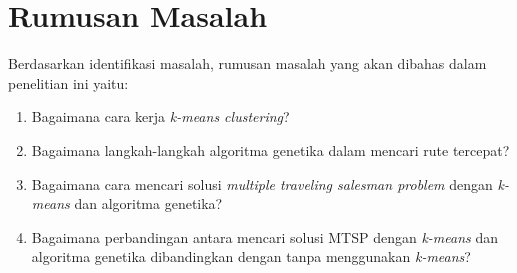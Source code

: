 \section{Rumusan Masalah}

Berdasarkan identifikasi masalah, rumusan masalah yang akan dibahas dalam penelitian ini yaitu:
\begin{enumerate}
    \item Bagaimana cara kerja \textit{k-means clustering}?
    \item Bagaimana langkah-langkah algoritma genetika dalam mencari rute tercepat?
    \item Bagaimana cara mencari solusi \textit{multiple traveling salesman problem} dengan \textit{k-means} dan algoritma genetika?
    \item Bagaimana perbandingan antara mencari solusi MTSP dengan \textit{k-means} dan algoritma genetika dibandingkan dengan tanpa menggunakan \textit{k-means}?
\end{enumerate}